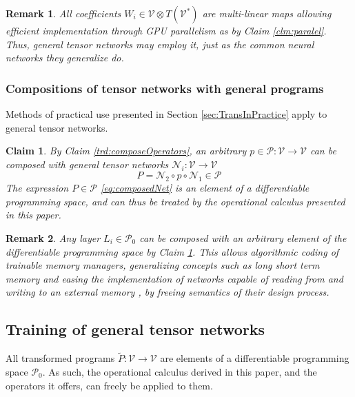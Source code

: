 \documentclass[smallcondensed]{svjour3}
\newcommand{\VV}{\mathcal{V}}
\newcommand{\NN}{\mathcal{N}}
\newcommand{\dP}{\mathcal{P}}
\newtheorem{trditev}{Claim}[section]
\newtheorem{opomba}{Remark}[section]
\begin{document}
\begin{opomba}
All coefficients $W_i\in \VV\otimes T(\VV^*)$ are multi-linear maps allowing efficient implementation through GPU parallelism as by Claim \ref{clm:paralel}. Thus, general tensor networks may employ it, just as the common neural networks they generalize do.
\end{opomba}

\subsubsection{Compositions of tensor networks with general programs}\label{sec:compoNetProg}

Methods of practical use presented in Section \ref{sec:TransInPractice} apply to general tensor networks.
\begin{trditev}\label{clm:composedNet}
By Claim \ref{trd:composeOperators}, an arbitrary $p\in\dP:\VV\to\VV$ can be composed with general tensor networks $\NN_i:\VV\to\VV$ 
\begin{equation}\label{eq:composedNet}
P=\NN_2\circ p\circ\NN_1 \in \dP
\end{equation}
The expression $P\in\dP$ \eqref{eq:composedNet} is an element of a differentiable programming space, and can thus be treated by the operational calculus presented in this paper. 
\end{trditev}

\begin{opomba}
Any layer $L_i\in\dP_0$ can be composed with an arbitrary element of the differentiable programming space by Claim  \ref{clm:composedNet}. This allows algorithmic coding of trainable memory managers, generalizing concepts such as long short term memory \cite{LSTM} and easing the implementation of networks capable of reading from and writing to an external memory \cite{netRam}, by freeing semantics of their design process.
\end{opomba}

\subsection{Training of general tensor networks}\label{sec:trainNet}

All transformed programs $\tilde{P}:\VV\to\VV$ are elements of a differentiable programming space $\dP_0$. As such, the operational calculus derived in this paper, and the operators it offers, can freely be applied to them.
\end{document}
